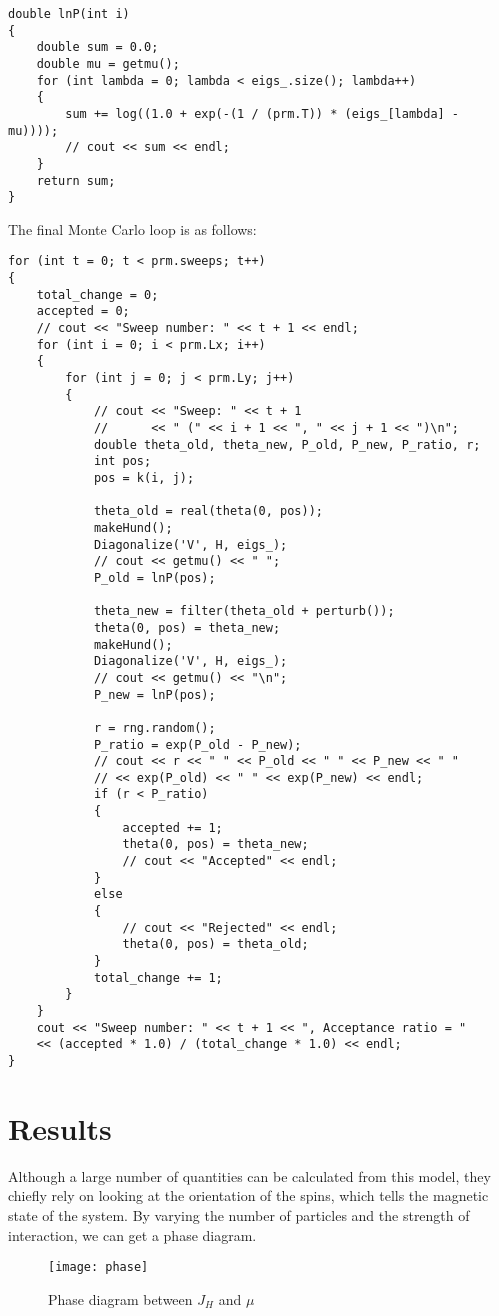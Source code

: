 \documentclass[]{article}
\begin{document}
\begin{lstlisting}
double lnP(int i)
{
	double sum = 0.0;
	double mu = getmu();
	for (int lambda = 0; lambda < eigs_.size(); lambda++)
	{
		sum += log((1.0 + exp(-(1 / (prm.T)) * (eigs_[lambda] - mu))));
		// cout << sum << endl;
	}
	return sum;
} 
\end{lstlisting}
\newpage
The final Monte Carlo loop is as follows:
\begin{lstlisting}
for (int t = 0; t < prm.sweeps; t++)
{
	total_change = 0;
	accepted = 0;
	// cout << "Sweep number: " << t + 1 << endl;
	for (int i = 0; i < prm.Lx; i++)
	{
		for (int j = 0; j < prm.Ly; j++)
		{
			// cout << "Sweep: " << t + 1
			//      << " (" << i + 1 << ", " << j + 1 << ")\n";
			double theta_old, theta_new, P_old, P_new, P_ratio, r;
			int pos;
			pos = k(i, j);
			
			theta_old = real(theta(0, pos));
			makeHund();
			Diagonalize('V', H, eigs_);
			// cout << getmu() << " ";
			P_old = lnP(pos);
			
			theta_new = filter(theta_old + perturb());
			theta(0, pos) = theta_new;
			makeHund();
			Diagonalize('V', H, eigs_);
			// cout << getmu() << "\n";
			P_new = lnP(pos);
			
			r = rng.random();
			P_ratio = exp(P_old - P_new);
			// cout << r << " " << P_old << " " << P_new << " "
			// << exp(P_old) << " " << exp(P_new) << endl;
			if (r < P_ratio)
			{
				accepted += 1;
				theta(0, pos) = theta_new;
				// cout << "Accepted" << endl;
			}
			else
			{
				// cout << "Rejected" << endl;
				theta(0, pos) = theta_old;
			}
			total_change += 1;
		}
	}
	cout << "Sweep number: " << t + 1 << ", Acceptance ratio = "
	<< (accepted * 1.0) / (total_change * 1.0) << endl;
}
\end{lstlisting}

\newpage
\section{Results}
Although a large number of quantities can be calculated from this model, they chiefly rely on looking at the orientation of the spins, which tells the magnetic state of the system. By varying the number of particles and the strength of interaction, we can get a phase diagram.\cite{PhysRevLett.80.845}
\begin{figure}[h!]
	\centering
	\texttt{[image: phase]}
	\caption{Phase diagram between $ J_H $ and $ \mu $}
	\label{fig:phase}
\end{figure}
\end{document}
